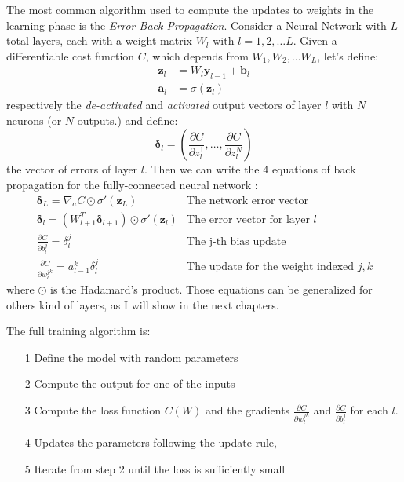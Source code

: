 \documentclass[12pt,a4paper]{report}
\begin{document}
The most common algorithm used to compute the updates to weights in the learning phase is the {\it Error Back Propagation}. 
Consider a Neural Network with $L$ total layers, each with a weight matrix $W_l$ with $l = 1, 2, \dots L$.
Given a differentiable cost function $C$, which depends from $W_1, W_2,\dots W_L$, let's define:
\begin{align}
 \bm{z}_l &= W_l \bm{y}_{l-1} + \bm{b}_l  \\ 
 \bm{a}_l &= \sigma(\bm{z}_l)
\end{align}
respectively the {\it de-activated} and {\it activated} output vectors of layer $l$ with $N$ neurons (or $N$ outputs.) and define:
\begin{equation}
 \bm{\delta}_l = (\frac{\partial C}{\partial z_l^1}, \dots , \frac{\partial C}{\partial z_l^N}) 
\end{equation}
the vector of errors of layer $l$. Then we can write the 4 equations of back propagation for the fully-connected neural network \cite{neural-net-nielsen}:
\begin{align}
  &\bm{\delta}_L = \nabla_a C \odot \sigma'(\bm{z}_L) & \mbox{The network error vector} \\ 
  &\bm{\delta}_l = (W_{l+1}^T \bm{\delta}_{l+1}) \odot \sigma'(\bm{z}_l) & \mbox{The error vector for layer $l$} \\
  &\frac{\partial C}{\partial b_l^j} = \delta_l^j & \mbox{The j-th bias update} \\
  &\frac{\partial C}{\partial w_l^{j k}} = a_{l-1}^k \delta_{l}^{j} & \mbox{The update for the weight indexed $j,k$ }
\end{align}
where  $\odot$ is the Hadamard's product.
Those equations can be generalized for others kind of layers, as I will show in the next chapters. 

The full training algorithm is: 
\begin{itemize}
 \setlength\itemsep{-0.3em}
 \item [1] Define the model with random parameters
 \item [2] Compute the output for one of the inputs
 \item [3] Compute the loss function $C(W)$ and the gradients $\frac{\partial C}{\partial w_l^{j k}}$ and $\frac{\partial C}{\partial b_l^j}$ for each $l$.
 \item [4] Updates the parameters following the update rule, 
 \item [5] Iterate from step 2 until the loss is sufficiently small
\end{itemize}
\end{document}

